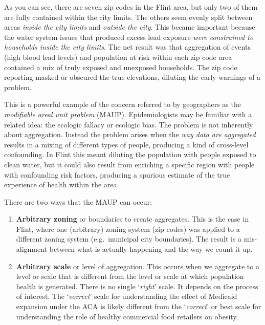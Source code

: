 \documentclass[
]{book}
\providecommand{\tightlist}{%
  \setlength{\itemsep}{0pt}\setlength{\parskip}{0pt}}
\begin{document}
As you can see, there are seven zip codes in the Flint area, but only two of them are fully contained within the city limits. The others seem evenly split between areas \emph{inside the city limits} and \emph{outside the city}. This became important because the water system issues that produced excess lead exposure \emph{were constrained to households inside the city limits}. The net result was that aggregation of events (high blood lead levels) and population at risk within each zip code area contained a mix of truly exposed and unexposed households. The zip code reporting masked or obscured the true elevations, diluting the early warnings of a problem.

This is a powerful example of the concern referred to by geographers as the \emph{modifiable areal unit problem} (MAUP). Epidemiologists may be familiar with a related idea: the ecologic fallacy or ecologic bias. The problem is not inherently about aggregation. Instead the problem arises when the \emph{way data are aggregated} results in a mixing of different types of people, producing a kind of cross-level confounding. In Flint this meant diluting the population with people exposed to clean water, but it could also result from enriching a specific region with people with confounding risk factors, producing a spurious estimate of the true experience of health within the area.

There are two ways that the MAUP can occur:

\begin{enumerate}
\def\labelenumi{\arabic{enumi}.}
\tightlist
\item
  \textbf{Arbitrary zoning} or boundaries to create aggregates. This is the case in Flint, where one (arbitrary) zoning system (zip codes) was applied to a different zoning system (e.g.~municipal city boundaries). The result is a mis-alignment between what is actually happening and the way we count it up.
\item
  \textbf{Arbitrary scale} or level of aggregation. This occurs when we aggregate to a level or scale that is different from the level or scale at which population health is generated. There is no single `\emph{right}' scale. It depends on the process of interest. The `\emph{correct}' scale for understanding the effect of Medicaid expansion under the ACA is likely different from the `\emph{correct}' or best scale for understanding the role of healthy commercial food retailers on obesity.
\end{enumerate}
\end{document}
